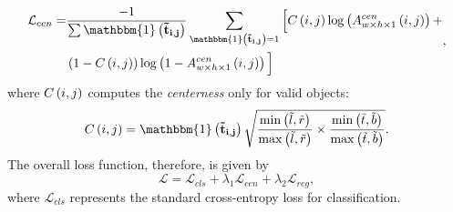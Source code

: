 \begin{equation}
    \begin{aligned}
        \label{eq:SiamCARCenLoss}
        \mathcal{L}_{cen} =
        &\frac{-1}{\sum \func{\mathbbm{1}}{\vect{\tilde{t}_{i, j}}}}
        \sum_{
            \func{\mathbbm{1}}{\vect{\tilde{t}_{i, j}}} = 1
        }
        \Big[
        \func{C}{i, j}
        \func{\log}{
            \func{\supsub{A}{w \times h \times 1}{cen}}{i, j}
        }
        +\\
        &\rbrackets{1 - \func{C}{i, j}}
        \func{\log}{
            1 - \func{\supsub{A}{w \times h \times 1}{cen}}{i, j}
        }
        \Big]
    \end{aligned},
\end{equation}
where ${C} \left( i, j \right)$ computes the \emph{centerness} only for valid objects:
\begin{equation}
    \label{eq:CenternesSiamCAR}
    \func{C}{i, j} =
    \func{\mathbbm{1}}{\vect{\tilde{t}_{i, j}}}
    \sqrt{
        \frac{
            \func{\min}{\tilde{l}, \tilde{r}}
        }{
            \func{\max}{\tilde{l}, \tilde{r}}
        }
        \times
        \frac{
            \func{\min}{\tilde{t}, \tilde{b}}
        }{
            \func{\max}{\tilde{t}, \tilde{b}}
        }
    }.
\end{equation}
The overall loss function, therefore, is given by
\begin{equation}
    \label{eq:SiamCAROverallLoss}
    \mathcal{L} =
    \mathcal{L}_{cls} +
    \lambda_1 \mathcal{L}_{cen} +
    \lambda_2 \mathcal{L}_{reg},
\end{equation}
where $\mathcal{L}_{cls}$ represents the standard cross-entropy loss for classification.
